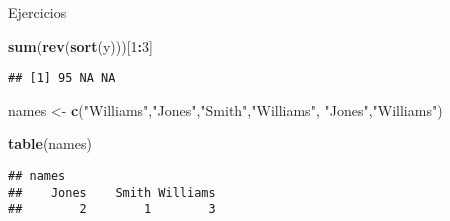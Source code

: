 \documentclass[ignorenonframetext,]{beamer}
\newenvironment{Shaded}{\begin{snugshade}}{\end{snugshade}}
\newcommand{\KeywordTok}[1]{\textcolor[rgb]{0.13,0.29,0.53}{\textbf{#1}}}
\newcommand{\DecValTok}[1]{\textcolor[rgb]{0.00,0.00,0.81}{#1}}
\newcommand{\StringTok}[1]{\textcolor[rgb]{0.31,0.60,0.02}{#1}}
\newcommand{\OperatorTok}[1]{\textcolor[rgb]{0.81,0.36,0.00}{\textbf{#1}}}
\newcommand{\NormalTok}[1]{#1}
\begin{document}
\begin{frame}[fragile]{Ejercicios}

\begin{Shaded}
\begin{Highlighting}[]
\KeywordTok{sum}\NormalTok{(}\KeywordTok{rev}\NormalTok{(}\KeywordTok{sort}\NormalTok{(y)))[}\DecValTok{1}\OperatorTok{:}\DecValTok{3}\NormalTok{]}
\end{Highlighting}
\end{Shaded}
\pause
\begin{verbatim}
## [1] 95 NA NA
\end{verbatim}

\begin{Shaded}
\begin{Highlighting}[]
\NormalTok{names <-}\StringTok{ }\KeywordTok{c}\NormalTok{(}\StringTok{"Williams"}\NormalTok{,}\StringTok{"Jones"}\NormalTok{,}\StringTok{"Smith"}\NormalTok{,}\StringTok{"Williams"}\NormalTok{,}
           \StringTok{"Jones"}\NormalTok{,}\StringTok{"Williams"}\NormalTok{)}
\end{Highlighting}
\end{Shaded}

\begin{Shaded}
\begin{Highlighting}[]
\KeywordTok{table}\NormalTok{(names)}
\end{Highlighting}
\end{Shaded}
\pause
\begin{verbatim}
## names
##    Jones    Smith Williams 
##        2        1        3
\end{verbatim}

\end{frame}
\end{document}
